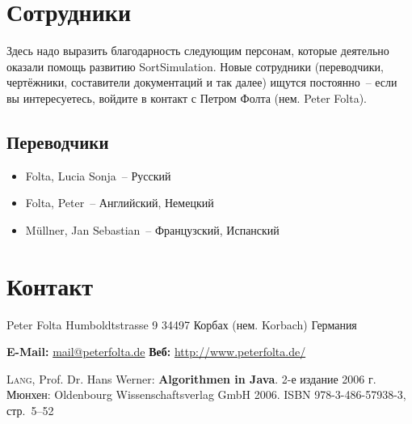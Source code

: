 \documentclass[11pt, a4paper, titlepage, twoside]{article}
\renewcommand{\emph}{\textbf}
\begin{document}
	
	
	\section{Сотрудники}
	
	Здесь надо выразить благодарность следующим персонам, которые деятельно оказали помощь развитию SortSimulation. Новые сотрудники (переводчики, чертёжники, составители документаций и так далее) ищутся постоянно~-- если вы интересуетесь, войдите в контакт с Петром Фолта (нем. Peter Folta).
	
	\subsection{Переводчики}
	
	\begin{itemize}
		\singlespacing
		\item{Folta, Lucia Sonja~-- Русский}
		\item{Folta, Peter~-- Английский, Немецкий}
		\item{Müllner, Jan Sebastian~-- Французский, Испанский}
	\end{itemize}
	
	\section{Контакт}
	
	\noindent{}Peter Folta\newline{}
	Humboldtstrasse 9\newline{}
	34497 Корбах (нем. Korbach)\newline{}
	Германия\newline{}
	
	\noindent{}\textbf{E-Mail:} \href{mailto:mail@peterfolta.de}{mail@peterfolta.de}\newline{}
	\textbf{Веб:} \href{http://www.peterfolta.de/}{http://www.peterfolta.de/}
	
	\begin{thebibliography}{99}
			\textsc{Lang}, Prof. Dr. Hans Werner: \emph{Algorithmen in Java}. 2-е издание 2006 г. Мюнхен: Oldenbourg Wissenschaftsverlag GmbH 2006. ISBN 978-3-486-57938-3, стр.~5--52
		\end{thebibliography}
	
	\listoffigures{}
	\lstlistoflistings{}
\end{document}
